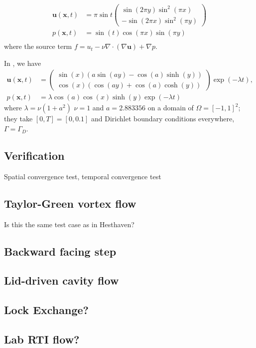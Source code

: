 \begin{equation}
  \begin{aligned}
    \bm{u}(\bm{x}, t) &= \pi \sin t 
    \begin{pmatrix}
      \sin( 2\pi y) \sin^2( \pi x) \\
      -\sin(2 \pi x) \sin^2(\pi y)
    \end{pmatrix} \\
    p(\bm{x}, t) &= \sin(t)\cos(\pi x) \sin(\pi y)\\
  \end{aligned}
  \label{eq:MS_stokes_guermond}
\end{equation}
where the source term $f= u_t -\nu \nabla \cdot( \nabla \bm{u} ) + \nabla p $.

In \cite{fehn_stability_2017}, we have
\begin{equation}
  \begin{aligned}
  \bm{u}(\bm{x}, t) &= 
  \begin{pmatrix}
    \sin(x) (a\sin(a y) - \cos(a)\sinh(y)) \\
    \cos(x) (\cos(a y) + \cos(a)\cosh(y))
  \end{pmatrix}
  \exp(-\lambda t),\\
    p(\bm{x}, t) &= \lambda \cos(a) \cos(x) \sinh(y) \exp(-\lambda t)
  \end{aligned}
  \label{eq:MS_unsteady_stokes_fehn}
\end{equation}
where $\lambda = \nu(1 + a^2)$ $\nu = 1$ and $a = 2.883356$ on a domain of  $\Omega = [-1, 1]^2$; they take $[0, T] = [0, 0.1]$ and Dirichlet boundary conditions everywhere, $\Gamma = \Gamma_D$.

\subsection{Verification}
Spatial convergence test, temporal convergence test




\subsection{Taylor-Green vortex flow}
Is this the same test case as in Hesthaven?

\subsection{Backward facing step}

\subsection{Lid-driven cavity flow}

\subsection{Lock Exchange?}
\subsection{Lab RTI flow?}

